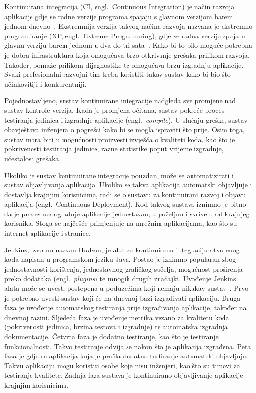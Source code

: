 Kontinuirana integracija (CI, engl.~Continuous Integration) je način razvoja aplikacije gdje se
radne verzije programa spajaju s glavnom verzijom barem jednom dnevno~\citep{fowler2006continuous}.
Ekstremnija verzija takvog načina razvoja nazvana je ekstremno programiranje (XP, engl.~Extreme
Programming), gdje se radna verzija spaja u glavnu verziju barem jednom u dva do tri
sata~\citep{beck1999embracing}. Kako bi to bilo moguće potrebna je dobra infrastruktura koja
omogućava brzo otkrivanje grešaka prilikom razvoja. Također, pomaže prilikom dijagnostike te
omogućava brzu izgradnju aplikacije. Svaki profesionalni razvojni tim treba koristiti takav sustav
kako bi bio što učinkovitiji i konkurentniji.

Pojednostavljeno, sustav kontinuirane integracije nadgleda sve promjene nad sustav kontrole verzija.
Kada je promjena očitana, sustav pokreće proces testiranja jedinica i izgradnje aplikacije
(engl.~\textit{compile}). U slučaju greške, sustav obavještava inženjera o pogrešci kako bi se
mogla ispraviti što prije. Osim toga, sustav mora biti u mogućnosti proizvesti izvješća o
kvaliteti koda, kao što je pokrivenosti testiranja jedinice, razne statistike poput vrijeme
izgradnje, učestalost grešaka.

Ukoliko je sustav kontinuirane integracije pouzdan, može se automatizirati i sustav objavljivanja
aplikacija. Ukoliko se takva aplikacija automatski objavljuje i dostavlja krajnjim korisnicima, radi
se o sustavu za kontinuirani razvoj i objavu aplikacija (engl.~Continuous Deployment). Kod takvog
sustava iznimno je bitno da je proces nadogradnje aplikacije jednostavan, a poželjno i skriven, od
krajnjeg korisnika. Stoga se najčešće primjenjuje na mrežnim aplikacijama, kao što su internet
aplikacije i stranice.

Jenkins, izvorno nazvan Hudson, je alat za kontinuiranu integraciju otvorenog koda napisan u
programskom jeziku Java. Postao je iznimno popularan zbog jednostavnosti korištenja, jednostavnog
grafičkog sučelja, mogućnost proširenja preko dodataka (engl.~\textit{plugins}) te mnogih drugih
značajki. Uvođenje Jenkins alata može se uvesti postepeno u poduzećima koji nemaju nikakav
sustav~\citep{smart2011jenkins}. Prvo je potrebno uvesti sustav koji će na dnevnoj bazi izgrađivati
aplikaciju. Druga faza je uvođenje automatskog testiranja prije izgrađivanja aplikacije, također na
dnevnoj razini. Sljedeća faza je uvođenje metrika vezano za kvalitetu koda (pokrivenosti jedinica,
brzina testova i izgradnje) te automatska izgradnja dokumentacije. Četvrta faza je dodatno
testiranje, kao što je testiranje funkcionalnosti. Takvo testiranje odvija se nakon što je
aplikacija izgrađena. Peta faza je gdje se aplikacija koja je prošla dodatno testiranje automatski
objavljuje. Takvu aplikaciju mogu koristiti osobe koje nisu inženjeri, kao što su timovi za
testiranje kvalitete. Zadnja faza sustava je kontinuirano objavljivanje aplikacije krajnjim
korisnicima.

